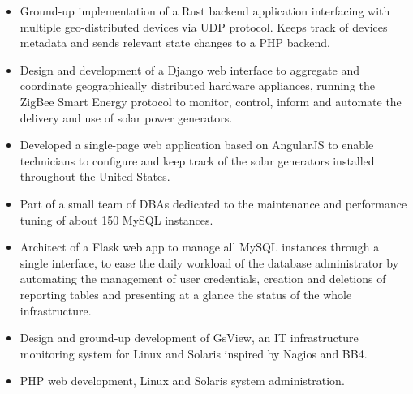 \documentclass{resume}
\begin{document}

\begin{itemize}
\item Ground-up implementation of a Rust backend application interfacing with multiple geo-distributed devices via UDP protocol. Keeps track of devices metadata and sends relevant state changes to a PHP backend.
\end{itemize}


\begin{itemize}
\item Design and development of a Django web interface to aggregate and coordinate geographically distributed hardware appliances, running the ZigBee Smart Energy protocol to monitor, control, inform and automate the delivery and use of solar power generators.
\item Developed a single-page web application based on AngularJS to enable technicians to configure and keep track of the solar generators installed throughout the United States.
\end{itemize}



\begin{itemize}
\item Part of a small team of DBAs dedicated to the maintenance and performance tuning of about 150 MySQL instances.
\item Architect of a Flask web app to manage all MySQL instances through a single interface, to ease the daily workload of the database administrator by automating the management of user credentials, creation and deletions of reporting tables and presenting at a glance the status of the whole infrastructure.
\end{itemize}


\begin{itemize}
\item Design and ground-up development of GsView, an IT infrastructure monitoring system for Linux and Solaris inspired by Nagios and BB4.
\item PHP web development, Linux and Solaris system administration.
\end{itemize}
\end{document}
